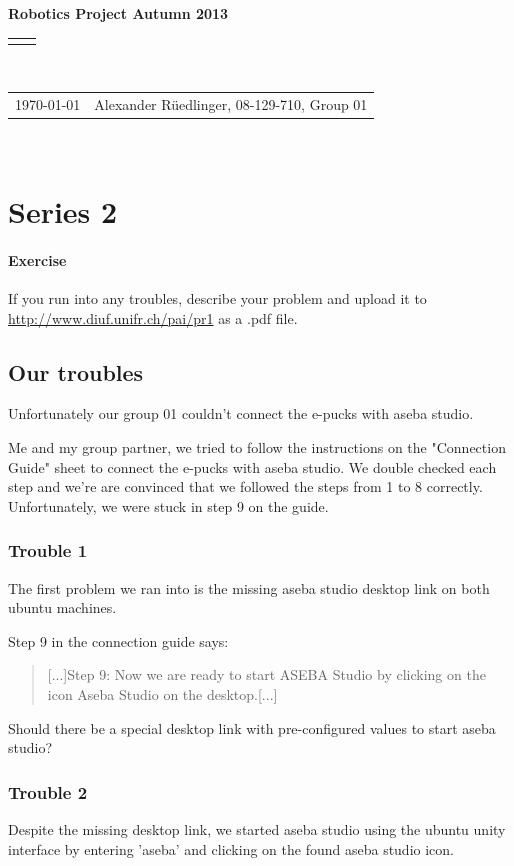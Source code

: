 \documentclass[12pt]{article}
\renewcommand{\title}[1]{\textbf{#1}\\}
\renewcommand{\line}{\begin{tabularx}{\textwidth}{X>{\raggedleft}X}\hline\\\end{tabularx}\\[-0.5cm]}
\newcommand{\leftright}[2]{\begin{tabularx}{\textwidth}{X>{\raggedleft}X}#1%
& #2\\\end{tabularx}\\[-0.5cm]}
\begin{document}
\title{Robotics Project  Autumn 2013}
\line
\leftright{\today}{Alexander Rüedlinger, 08-129-710, Group 01} %
\section*{Series 2}
\paragraph{Exercise}
If you run into any troubles, describe your problem and upload it to \\
\url{http://www.diuf.unifr.ch/pai/pr1} as a .pdf file.

\subsection*{Our troubles}
Unfortunately our group 01 couldn't connect the e-pucks with aseba studio.

Me and my group partner, we tried to follow the instructions on the "Connection Guide" sheet to connect the e-pucks with aseba studio. We double checked each step and we're are convinced that we followed the steps from 1 to 8 correctly. Unfortunately, we were stuck in step 9 on the guide.

\subsubsection*{Trouble 1}

The first problem we ran into is the missing aseba studio desktop link on both ubuntu machines.

Step 9 in the connection guide says:
\begin{quote}
[...]Step 9: Now we are ready to start ASEBA Studio by clicking on the icon Aseba Studio on the desktop.[...] 
\end{quote}

Should there be a special desktop link with pre-configured values to start aseba studio?

\subsubsection*{Trouble 2}
Despite the missing desktop link, we started aseba studio using the ubuntu unity interface by entering 'aseba' and clicking on the found aseba studio icon. 
\end{document}
